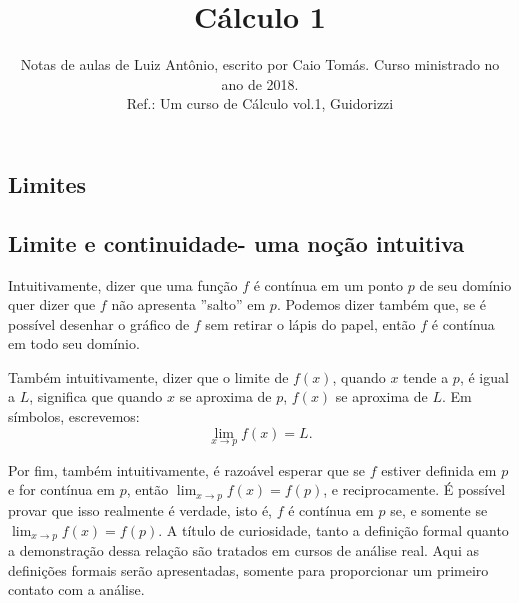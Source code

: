\documentclass{article}
\title{\textbf{Cálculo 1}}
\author{Notas de aulas de Luiz Antônio, escrito por Caio Tomás. Curso ministrado no ano de 2018.\\ Ref.: Um curso de Cálculo vol.1, Guidorizzi}
\date{}
\begin{document}
{\selectfont
\begin{titlepage}
\clearpage \maketitle \thispagestyle{empty}
\end{titlepage}

\clearpage \tableofcontents \thispagestyle{empty}

\begin{newpage}
\section{Limites}
\subsection{Limite e continuidade- uma noção intuitiva}
\hspace{12pt} Intuitivamente, dizer que uma função $f$ é contínua em um ponto $p$ de seu domínio quer dizer que $f$ não apresenta ''salto'' em $p$. Podemos dizer também que, se é possível desenhar o gráfico de $f$ sem retirar o lápis do papel, então $f$ é contínua em todo seu domínio.
\par Também intuitivamente, dizer que o limite de $f(x)$, quando $x$ tende a $p$, é igual a $L$, significa que quando $x$ se aproxima de $p$, $f(x)$ se aproxima de $L$. Em símbolos, escrevemos:
\begin{equation*}\displaystyle{\lim_{x\to p}f(x) = L}.\end{equation*}
\par Por fim, também intuitivamente, é razoável esperar que se $f$ estiver definida em $p$ e for contínua em $p$, então $\displaystyle{\lim_{x\to p}f(x) = f(p)}$, e reciprocamente. É possível provar que isso realmente é verdade, isto é, $f$ é contínua em $p$ se, e somente se $\displaystyle{\lim_{x\to p}f(x) = f(p)}$. A título de curiosidade, tanto a definição formal quanto a demonstração dessa relação são tratados em cursos de análise real. Aqui as definições formais serão apresentadas, somente para proporcionar um primeiro contato com a análise.
\par
\vspace{0.3cm}  

\end{newpage}}
\end{document}
